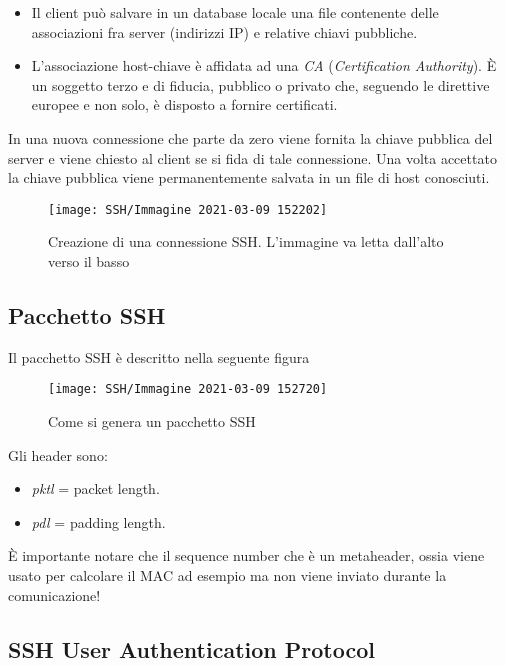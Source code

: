 \documentclass[14pt]{extreport}
\begin{document}
\begin{itemize}
    \item Il client può salvare in un database locale una file contenente delle associazioni fra server (indirizzi IP) e relative chiavi pubbliche.
    
    \item L'associazione host-chiave è affidata ad una \textit{CA} (\textit{Certification Authority}). È un soggetto terzo e di fiducia, pubblico o privato che, seguendo le direttive europee e non solo, è disposto a fornire certificati.
\end{itemize}

In una nuova connessione che parte da zero viene fornita la chiave pubblica del server e viene chiesto al client se si fida di tale connessione. Una volta accettato la chiave pubblica viene permanentemente salvata in un file di host conosciuti. 


\begin{figure}[H]
    \centering
    \texttt{[image: SSH/Immagine 2021-03-09 152202]}
    \caption{Creazione di una connessione SSH. L'immagine va letta dall'alto verso il basso}
\end{figure}

\subsection{Pacchetto SSH}
Il pacchetto SSH è descritto nella seguente figura



\begin{figure}[H]
    \centering
    \texttt{[image: SSH/Immagine 2021-03-09 152720]}
    \caption{Come si genera un pacchetto SSH}
\end{figure}

Gli header sono:

\begin{itemize}
    \item \textit{pktl} = packet length.
    
    \item \textit{pdl} = padding length.
\end{itemize}


È importante notare che il sequence number che è un metaheader, ossia viene usato per calcolare il MAC ad esempio ma non viene inviato durante la comunicazione!


\subsection{SSH User Authentication Protocol}
\end{document}
